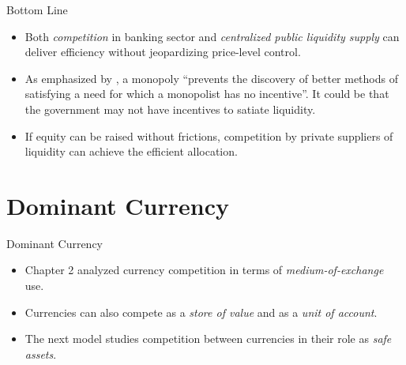 \documentclass[11pt,aspectratio=169]{beamer}
\begin{document}
\begin{frame}{Bottom Line}
\small
\begin{itemize}
    \item Both \emph{competition} in banking sector and \emph{centralized public liquidity supply} can deliver efficiency without jeopardizing price-level control.
    \vspace{1em}
    \item As emphasized by \textcite{Hayek1976Denationalization}, a monopoly “prevents the discovery of better methods of satisfying a need for which a monopolist has no incentive”. It could be that the government may not have incentives to satiate liquidity.
    \vspace{1em}
    \item If equity can be raised without frictions, competition by private suppliers of liquidity can achieve the efficient allocation.
\end{itemize}
\end{frame}

\section{Dominant Currency}

\begin{frame}{Dominant Currency}
\small
\begin{itemize}
    \item Chapter 2 analyzed currency competition in terms of \emph{medium-of-exchange} use.
    \vspace{0.7em}

    \item Currencies can also compete as a \emph{store of value} and as a \emph{unit of account}.
    \vspace{0.7em}

    \item The next model studies competition between currencies in their role as \emph{safe assets}.
\end{itemize}
\end{frame}
\end{document}
